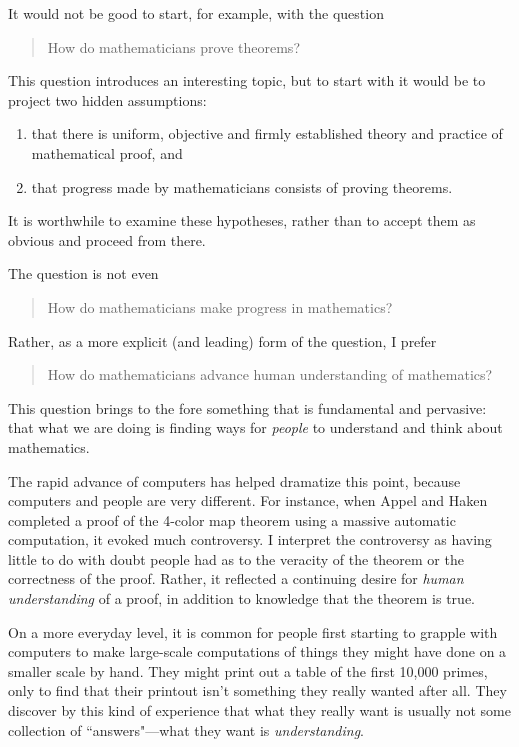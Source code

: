 \documentclass[12pt]{amsart}
\begin{document}
It would not be good to start, for example, with the 
question
\begin{quotation}
How do mathematicians prove theorems?
\end{quotation}  
This question introduces an interesting topic, but 
to start with it would be to project two hidden assumptions:
\begin{enumerate}  
\item that there is uniform, objective and firmly 
established theory and practice of mathematical proof, and
\item that progress made by mathematicians consists of 
proving 
theorems. \end{enumerate}
It is worthwhile to examine these hypotheses, rather than 
to accept
them as obvious and proceed from there.

The question is not even
\begin{quote}
How do mathematicians make progress in mathematics?
\end{quote} 
Rather, as a more explicit (and leading) form of the 
question, I prefer
\begin{quote}
How do mathematicians advance human understanding of 
mathematics?
\end{quote}

This question brings to the fore something that is
fundamental and pervasive: that what we are doing is finding
ways for {\it people} to understand and think about 
mathematics.

The rapid advance of computers has helped 
dramatize this point, because computers and people are 
very different.
For instance, when Appel and Haken completed a proof of 
the 4-color 
map theorem using a massive automatic computation, it 
evoked much controversy.
I interpret the controversy as having
little to do with doubt people had as to the veracity 
of the theorem or the correctness of the proof.  Rather, 
it reflected a 
continuing desire for {\it human understanding} of a 
proof, in addition
to knowledge that the theorem is true.

On a more everyday level, it is common for people first 
starting to 
grapple with computers to make large-scale computations
of things they  might have done on a smaller scale by hand.
They might print out a table of the first 10,000 primes,
only to find that their printout isn't 
something they really wanted after all.  They discover by 
this kind of
experience that what they really want is usually not some
collection of ``answers"---what they want is {\it 
understanding}. 
\end{document}
